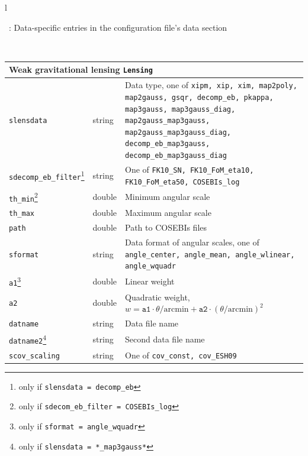 \documentclass[11pt, chapterprefix, headsepline]{scrartcl}
\newcommand{\onlyif}[2]{\footnote{only if \texttt{#1 =\; #2}}}
\newcommand{\mythemp}{$^{\renewcommand{\thempfootnote}{\alph{mpfootnote}}\thempfootnote}$}
\begin{document}
\begin{longtable}{l}
  \label{tab:modules-entries}

  \centerline{\tablename\ \thetable{}: Data-specific entries in the configuration file's data
    section}\\

  \endfirsthead


\begin{minipage}{\textwidth}
 \begin{tabularx}{\textwidth}{llX}
  \\
  \hline
    \hline \multicolumn{3}{l}{\rul Weak gravitational lensing \quad \texttt{Lensing}} \\ \hline
    \texttt{slensdata} & string & Data type, one of \texttt{xipm, xip,
    xim, map2poly, map2gauss, gsqr, decomp\_eb, pkappa, map3gauss,
    map3gauss\_diag, map2gauss\_map3gauss, map2gauss\_map3gauss\_diag,
    decomp\_eb\_map3gauss, decomp\_eb\_map3gauss\_diag} \\
    \texttt{sdecomp\_eb\_filter}\onlyif{slensdata}{decomp\_eb} & string & One of \texttt{FK10\_SN,
      FK10\_FoM\_eta10, FK10\_FoM\_eta50, COSEBIs\_log} \\
    \texttt{th\_min}\onlyif{sdecom\_eb\_filter}{COSEBIs\_log} & double & Minimum angular scale \\
    \texttt{th\_max}\mythemp & double & Maximum angular scale \\
    \texttt{path}\mythemp & double & Path to COSEBIs files \\
    \texttt{sformat} & string & Data format of angular scales, one of
    \texttt{angle\_center, angle\_mean, angle\_wlinear,
      angle\_wquadr} \\
    \texttt{a1}\onlyif{sformat}{angle\_wquadr} & double & Linear weight \\
    \texttt{a2}\mythemp & double & Quadratic weight, $w = \texttt{a1} \cdot
    \theta/\mbox{arcmin} + \texttt{a2} \cdot \left(\theta/\mbox{arcmin}\right)^2$ \\
    \texttt{datname}   & string & Data file name \\
    \texttt{datname2}\onlyif{slensdata}{*\_map3gauss*}  & string & Second data file name \\
    \texttt{scov\_scaling} & string & One of \texttt{cov\_const, cov\_ESH09} \\

\end{tabularx}
\end{minipage}
\end{longtable}
\end{document}
